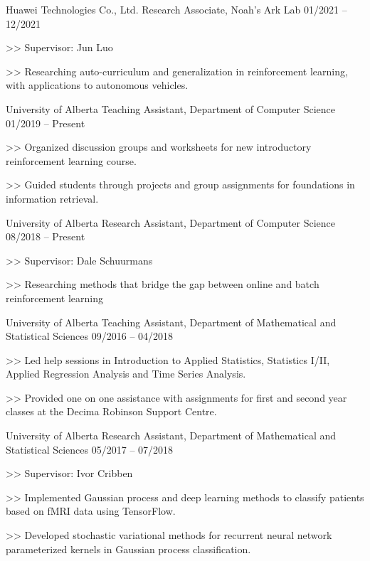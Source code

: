 \begin{cventries}
  \cventry
    {Huawei Technologies Co., Ltd.}
    {Research Associate, Noah's Ark Lab}
    {01/2021 -- 12/2021}
    {
      \begin{cvitems}
        \item[>>] Supervisor: Jun Luo
        \item[>>] Researching auto-curriculum and generalization in
        reinforcement learning, with applications to autonomous vehicles.
      \end{cvitems}
    }

  \cventry
    {University of Alberta}
    {Teaching Assistant, Department of Computer Science}
    {01/2019 -- Present}
    {
      \begin{cvitems}
        \item[>>] Organized discussion groups and worksheets for new introductory reinforcement learning course.
        \item[>>] Guided students through projects and group assignments for foundations in information retrieval.
      \end{cvitems}
    }

  \cventry
    {University of Alberta}
    {Research Assistant, Department of Computer Science}
    {08/2018 -- Present}
    {
      \begin{cvitems}
      \item[>>] Supervisor: Dale Schuurmans 
      \item[>>] Researching methods that bridge the gap between online and batch
      reinforcement learning
      \end{cvitems}
    }

  \cventry
    {University of Alberta}
    {Teaching Assistant, Department of Mathematical and Statistical Sciences} {09/2016 -- 04/2018}
    {
      \begin{cvitems}
        \item[>>] Led help sessions in Introduction to Applied Statistics, Statistics I/II, Applied Regression Analysis and Time Series Analysis.
        \item[>>] Provided one on one assistance with assignments for first and second year classes at the Decima Robinson Support Centre.
      \end{cvitems}
    }

  \cventry
    {University of Alberta}
    {Research Assistant, Department of Mathematical and Statistical Sciences}    {05/2017 -- 07/2018}
    {
      \begin{cvitems}
        \item[>>] Supervisor: Ivor Cribben
        \item[>>] Implemented Gaussian process and deep learning methods to classify patients based on fMRI data using TensorFlow.
        \item[>>] Developed stochastic variational methods for recurrent neural network parameterized kernels in Gaussian process classification.
      \end{cvitems}
    }

\end{cventries}
